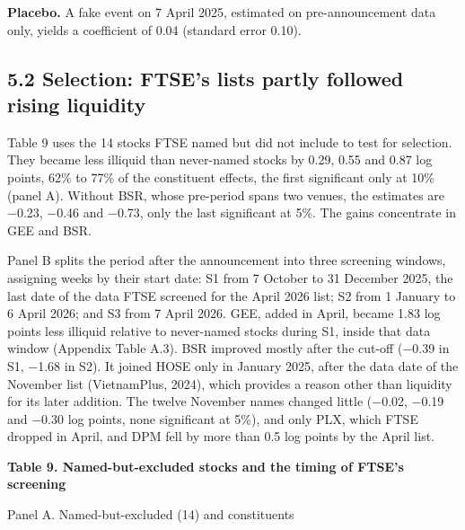 \textbf{Placebo.} A fake event on 7 April 2025, estimated on
pre-announcement data only, yields a coefficient of 0.04 (standard error
0.10).

\hypertarget{selection-ftses-lists-partly-followed-rising-liquidity}{%
\subsection{5.2 Selection: FTSE's lists partly followed rising
liquidity}\label{selection-ftses-lists-partly-followed-rising-liquidity}}

Table 9 uses the 14 stocks FTSE named but did not include to test for
selection. They became less illiquid than never-named stocks by 0.29,
0.55 and 0.87 log points, 62\% to 77\% of the constituent effects, the
first significant only at 10\% (panel A). Without BSR, whose pre-period
spans two venues, the estimates are −0.23, −0.46 and −0.73, only the
last significant at 5\%. The gains concentrate in GEE and BSR.

Panel B splits the period after the announcement into three screening
windows, assigning weeks by their start date: S1 from 7 October to 31
December 2025, the last date of the data FTSE screened for the April
2026 list; S2 from 1 January to 6 April 2026; and S3 from 7 April 2026.
GEE, added in April, became 1.83 log points less illiquid relative to
never-named stocks during S1, inside that data window (Appendix Table
A.3). BSR improved mostly after the cut-off (−0.39 in S1, −1.68 in S2).
It joined HOSE only in January 2025, after the data date of the November
list (VietnamPlus, 2024), which provides a reason other than liquidity
for its later addition. The twelve November names changed little (−0.02,
−0.19 and −0.30 log points, none significant at 5\%), and only PLX,
which FTSE dropped in April, and DPM fell by more than 0.5 log points by
the April list.

\textbf{Table 9. Named-but-excluded stocks and the timing of FTSE's
screening}

Panel A. Named-but-excluded (14) and constituents

